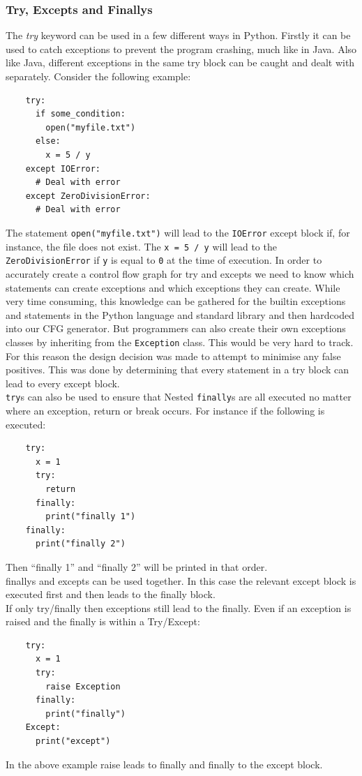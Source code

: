 \documentclass[12pt, titlepage]{article}
\begin{document}
\subsubsection{Try, Excepts and Finallys}
The \textit{try} keyword can be used in a few different ways in Python. Firstly it can be used to catch exceptions to prevent the program crashing, much like in Java. Also like Java, different exceptions in the same try block can be caught and dealt with separately. Consider the following example:
\begin{lstlisting}
    try:
      if some_condition:
        open("myfile.txt")
      else:
        x = 5 / y        
    except IOError:
      # Deal with error
    except ZeroDivisionError:
      # Deal with error
\end{lstlisting}
The statement \texttt{open("myfile.txt")} will lead to the \texttt{IOError} except block if, for instance, the file does not exist. The \texttt{x = 5 / y} will lead to the \texttt{ZeroDivisionError} if \texttt{y} is equal to \texttt{0} at the time of execution. In order to accurately create a control flow graph for try and excepts we need to know which statements can create exceptions and which exceptions they can create. While very time consuming, this knowledge can be gathered for the builtin exceptions and statements in the Python language and standard library and then hardcoded into our CFG generator. But programmers can also create their own exceptions classes by inheriting from the \texttt{Exception} class. This would be very hard to track. For this reason the design decision was made to attempt to minimise any false positives. This was done by determining that every statement in a try block can lead to every except block. \\
\texttt{try}s can also be used to ensure that Nested \texttt{finally}s are all executed no matter where an exception, return or break occurs. For instance if the following is executed:
\begin{lstlisting}
    try:
      x = 1
      try:
        return
      finally:
        print("finally 1")
    finally:
      print("finally 2")
\end{lstlisting}
Then ``finally 1'' and ``finally 2'' will be printed in that order. \\
finallys and excepts can be used together. In this case the relevant except block is executed first and then leads to the finally block. \\
If only try/finally then exceptions still lead to the finally. Even if an exception is raised and the finally is within a Try/Except:
\begin{lstlisting}
    try:
      x = 1
      try:
        raise Exception
      finally:
        print("finally")
    Except:
      print("except")
\end{lstlisting}
In the above example raise leads to finally and finally to the except block.
\end{document}
